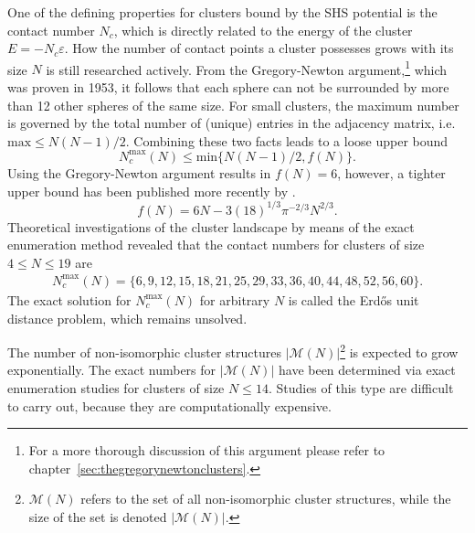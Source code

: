 One of the defining properties for clusters bound by the \ac{SHS} potential is
the contact number $N_c$, which is directly related to the energy of the cluster
$E=-N_c\varepsilon$. How the number of contact points a cluster possesses grows
with its size $N$ is still researched actively. From the Gregory-Newton
argument,\footnote{For a more thorough discussion of this argument please refer
to chapter~\ref{sec:thegregorynewtonclusters}.} which was proven in 1953, it
follows that each sphere can not be surrounded by more than 12 other spheres of
the same size. For small clusters, the maximum number is governed by the total
number of (unique) entries in the adjacency matrix, i.e. $\text{max}\leq
N(N-1)/2$. Combining these two facts leads to a loose upper bound
%
\begin{equation}
    N_c^\mathrm{max}(N) \le \text{min}\{N(N-1)/2,f(N)\}.
    \label{eqn:upperlimitNc}
\end{equation}
%
Using the Gregory-Newton argument results in $f(N)=6$, however, a tighter upper
bound has been published more recently by
\citeauthor{Bezdek-2013}\autocite{Bezdek-2013}.
%
\begin{equation}
    f(N)=6N-3(18)^{1/3}\pi^{-2/3}N^{2/3}.
    \label{eqn:upperlimitBR}
\end{equation}
%
Theoretical investigations of the cluster landscape by means of the exact
enumeration method revealed that the contact numbers for clusters of size $4
\leq N \leq 19$ are\autocite{Hoy_Structuredynamicsmodel_2015,Holmes-Cerfon_EnumeratingRigidSphere_2016}
%
\begin{align}
    N_c^\mathrm{max}(N) =\{6,9,12,15,18,21,25,29,33,36,40,44,48,52,56,60\}.
\end{align}
%
The exact solution for $N_c^\mathrm{max}(N)$ for arbitrary $N$ is called the
Erd\H{o}s unit distance problem, which remains unsolved.\autocite{Erdos-1946}

The number of non-isomorphic cluster structures
$|\mathcal{M}(N)|$\footnote{$\mathcal{M}(N)$ refers to the set of all
non-isomorphic cluster structures, while the size of the set is denoted
$|\mathcal{M}(N)|$.} is expected to grow
exponentially.\autocite{Stillinger_Exponentialmultiplicityinherent_1999,Oganov-2006,Forman_ModelingAggregationProcesses_2017}
The exact numbers for $|\mathcal{M}(N)|$ have been determined via exact
enumeration studies for clusters of size $N \leq
14$.\autocite{Hoy_Structuredynamicsmodel_2015,Holmes-Cerfon_EnumeratingRigidSphere_2016}
Studies of this type are difficult to carry out, because they are
computationally expensive.\autocite{Heiles_Globaloptimizationclusters_2013}

